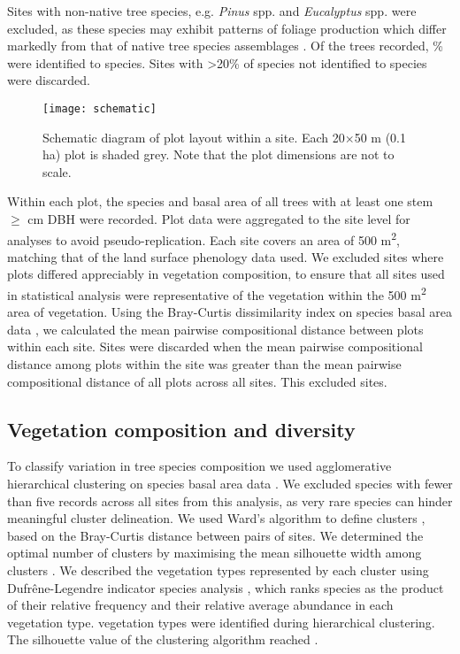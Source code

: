 \documentclass[11pt,a4paper]{article}
\begin{document}
Sites with non-native tree species, e.g. \textit{Pinus} spp. and \textit{Eucalyptus} spp. were excluded, as these species may exhibit patterns of foliage production which differ markedly from that of native tree species assemblages \citep{Broadhead2003}. Of the \nTrees{} trees recorded, \perSpID{}\% were identified to species. Sites with >20\% of species not identified to species were discarded.

\begin{figure}[H]
\centering
	\texttt{[image: schematic]}
	\caption{Schematic diagram of plot layout within a site. Each 20$\times$50 m (0.1 ha) plot is shaded grey. Note that the plot dimensions are not to scale.}
	\label{schematic}
\end{figure}

Within each plot, the species and basal area of all trees with at least one stem $\geq$\stemSize{} cm DBH were recorded. Plot data were aggregated to the site level for analyses to avoid pseudo-replication. Each site covers an area of 500 m\textsuperscript{2}, matching that of the land surface phenology data used. We excluded sites where plots differed appreciably in vegetation composition, to ensure that all sites used in statistical analysis were representative of the vegetation within the 500 m\textsuperscript{2} area of vegetation. Using the Bray-Curtis dissimilarity index on species basal area data \citep{Faith1987}, we calculated the mean pairwise compositional distance between plots within each site. Sites were discarded when the mean pairwise compositional distance among plots within the site was greater than the mean pairwise compositional distance of all plots across all sites. This excluded \plotDistN{} sites.

\subsection{Vegetation composition and diversity} 

To classify variation in tree species composition we used agglomerative hierarchical clustering on species basal area data \citep{Kreft2010, Fayolle2014}. We excluded species with fewer than five records across all sites from this analysis, as very rare species can hinder meaningful cluster delineation. We used Ward's algorithm to define clusters \citep{Murtagh2014}, based on the Bray-Curtis distance between pairs of sites. We determined the optimal number of clusters by maximising the mean silhouette width among clusters \citep{Rousseeuw1987}. We described the vegetation types represented by each cluster using Dufr\^{e}ne-Legendre indicator species analysis \citep{Dufrene1997}, which ranks species as the product of their relative frequency and their relative average abundance in each vegetation type. \Numberstringnum{\nCluster} vegetation types were identified during hierarchical clustering. The silhouette value of the clustering algorithm reached \silBest{}. 
\end{document}
